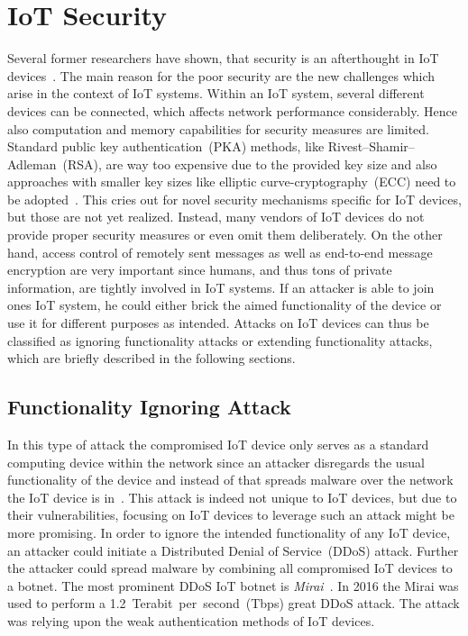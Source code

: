 \section{IoT Security} %
\label{sec:iot_security}


Several former researchers have shown, that security is an afterthought in IoT devices~\cite{Morgner:2016:AYBBUICSSCLS, Zhang:2017:UISTDCBWWNaWWG, Restuccia:2018:SITNPaRC, Angrishi:2017:TitiiiviIb, Grau:2015:Ctyf, Kolias:2017:DIMaOB}. The main reason for the poor security are the new challenges which arise in the context of IoT systems.
Within an IoT system, several different devices can be connected, which affects network performance considerably. Hence also computation and memory capabilities for security measures are limited. Standard public key authentication~(PKA) methods, like Rivest–Shamir–Adleman~(RSA), are way too expensive due to the provided key size and also approaches with smaller key sizes like elliptic curve-cryptography~(ECC) need to be adopted~\cite{Restuccia:2018:SITNPaRC}. This cries out for novel security mechanisms specific for IoT devices, but those are not yet realized. Instead, many vendors of IoT devices do not provide proper security measures or even omit them deliberately. On the other hand, access control of remotely sent messages as well as end-to-end message encryption are very important since humans, and thus tons of private information, are tightly involved in IoT systems. 
If an attacker is able to join ones IoT system, he could either brick the aimed functionality of the device or use it for different purposes as intended. Attacks on IoT devices can thus be classified as ignoring functionality attacks or extending functionality attacks, which are briefly described in the following sections.

\subsection{Functionality Ignoring Attack}
\label{sec:ignoring_func}

In this type of attack the compromised IoT device only serves as a standard computing device within the network since an attacker disregards the usual functionality of the device and instead of that spreads malware over the network the IoT device is in~\cite{Ronen:2016:EFAIDCSL}. This attack is indeed not unique to IoT devices, but due to their vulnerabilities, focusing on IoT devices to leverage such an attack might be more promising. In order to ignore the intended functionality of any IoT device, an attacker could initiate a Distributed Denial of Service~(DDoS) attack. Further the attacker could spread malware by combining all compromised IoT devices to a botnet. The most prominent DDoS IoT botnet is \textit{Mirai}~\cite{Donno:2017:ADIM, Kolias:2017:DIMaOB, Antonakakis:2017:UMB, Angrishi:2017:TitiiiviIb}. In 2016 the Mirai was used to perform a 1.2~Terabit~per~second~(Tbps) great DDoS attack. The attack was relying upon the weak authentication methods of IoT devices.


